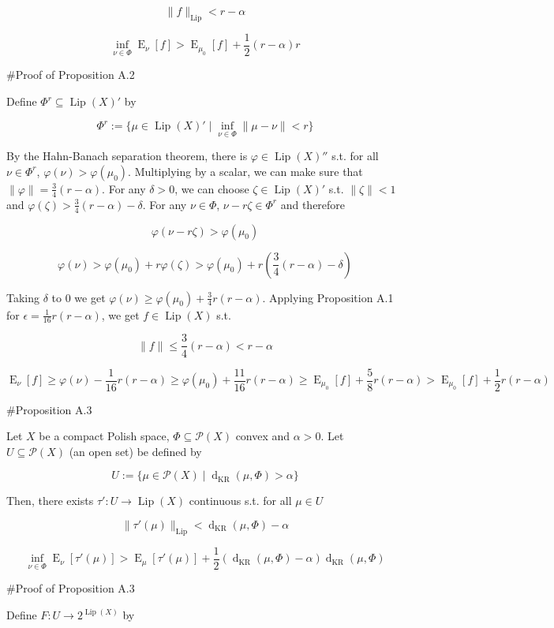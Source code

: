 \documentclass[a4paper]{article}
\DeclareMathOperator{\E}{E}
\newcommand{\Norm}[1]{\lVert #1 \rVert}
\newcommand{\Prob}{\mathcal{P}}
\newcommand{\Lip}{\operatorname{Lip}}
\newcommand{\NormL}[1]{\Norm{#1}_{\operatorname{Lip}}}
\newcommand{\Dkr}{\operatorname{d}_{\text{KR}}}
\begin{document}
$$\NormL{f} < r - \alpha$$

$$\inf_{\nu \in \Phi} \E_\nu[f] > \E_{\mu_0}[f] + \frac{1}{2}(r - \alpha) r$$

\#Proof of Proposition A.2

Define $\Phi^r \subseteq \Lip(X)'$ by

$$\Phi^r:=\{\mu \in \Lip(X)' \mid \inf_{\nu \in \Phi} \Norm{\mu - \nu} < r\}$$

By the Hahn-Banach separation theorem, there is $\varphi \in \Lip(X)''$ s.t. for all $\nu \in \Phi^r$, $\varphi(\nu) > \varphi(\mu_0)$. Multiplying by a scalar, we can make sure that $\Norm{\varphi} = \frac{3}{4}(r - \alpha)$. For any $\delta > 0$, we can choose $\zeta \in \Lip(X)'$ s.t. $\Norm{\zeta} < 1$ and $\varphi(\zeta) > \frac{3}{4}(r-\alpha) - \delta$.  For any $\nu \in \Phi$, $\nu - r \zeta \in \Phi^r$ and therefore

$$\varphi(\nu - r \zeta) > \varphi(\mu_0)$$

$$\varphi(\nu) > \varphi(\mu_0) + r \varphi(\zeta) > \varphi(\mu_0) + r (\frac{3}{4}(r-\alpha) - \delta)$$

Taking $\delta$ to 0 we get $\varphi(\nu) \geq \varphi(\mu_0) + \frac{3}{4} r (r - \alpha)$. Applying Proposition A.1 for $\epsilon = \frac{1}{16} r (r - \alpha)$, we get $f \in \Lip(X)$ s.t.

$$\Norm{f} \leq \frac{3}{4} (r - \alpha) < r - \alpha$$ 

$$\E_\nu[f] \geq \varphi(\nu) - \frac{1}{16} r (r - \alpha) \geq \varphi(\mu_0) + \frac{11}{16} r (r - \alpha) \geq \E_{\mu_0}[f] +  \frac{5}{8} r (r - \alpha) > \E_{\mu_0}[f] +  \frac{1}{2} r (r - \alpha)$$ 

\#Proposition A.3

Let $X$ be a compact Polish space, $\Phi \subseteq \Prob(X)$ convex and $\alpha > 0$. Let $U \subseteq \Prob(X)$ (an open set) be defined by

$$U:=\{\mu \in \Prob(X) \mid \Dkr(\mu, \Phi) > \alpha\}$$

Then, there exists $\tau': U \rightarrow \Lip(X)$ continuous s.t. for all $\mu \in U$

$$\NormL{\tau'(\mu)} < \Dkr(\mu,\Phi) - \alpha$$

$$\inf_{\nu \in \Phi} \E_\nu[\tau'(\mu)] > \E_\mu[\tau'(\mu)] + \frac{1}{2}(\Dkr(\mu,\Phi) - \alpha) \Dkr(\mu,\Phi)$$

\#Proof of Proposition A.3

Define $F: U \rightarrow 2^{\Lip(X)}$ by
\end{document}
